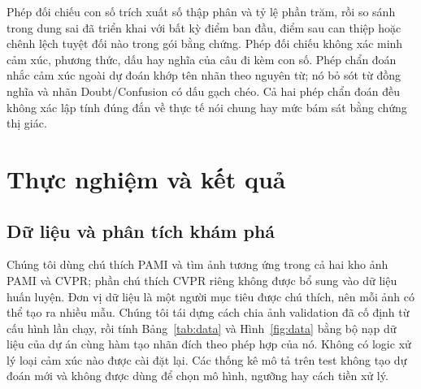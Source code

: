 \documentclass[conference]{IEEEtran}
\begin{document}
Phép đối chiếu con số trích xuất số thập phân và tỷ lệ phần trăm, rồi so sánh trong dung sai đã triển khai với bất kỳ điểm ban đầu, điểm sau can thiệp hoặc chênh lệch tuyệt đối nào trong gói bằng chứng. Phép đối chiếu không xác minh cảm xúc, phương thức, dấu hay nghĩa của câu đi kèm con số. Phép chẩn đoán nhắc cảm xúc ngoài dự đoán khớp tên nhãn theo nguyên từ; nó bỏ sót từ đồng nghĩa và nhãn Doubt/Confusion có dấu gạch chéo. Cả hai phép chẩn đoán đều không xác lập tính đúng đắn về thực tế nói chung hay mức bám sát bằng chứng thị giác.

\section{Thực nghiệm và kết quả}\label{sec:experiments}
\subsection{Dữ liệu và phân tích khám phá}\label{sec:data}
Chúng tôi dùng chú thích PAMI và tìm ảnh tương ứng trong cả hai kho ảnh PAMI và CVPR; phần chú thích CVPR riêng không được bổ sung vào dữ liệu huấn luyện. Đơn vị dữ liệu là một người mục tiêu được chú thích, nên mỗi ảnh có thể tạo ra nhiều mẫu. Chúng tôi tái dựng cách chia ảnh validation đã cố định từ cấu hình lần chạy, rồi tính Bảng~\ref{tab:data} và Hình~\ref{fig:data} bằng bộ nạp dữ liệu của dự án cùng hàm tạo nhãn đích theo phép hợp của nó. Không có logic xử lý loại cảm xúc nào được cài đặt lại. Các thống kê mô tả trên test không tạo dự đoán mới và không được dùng để chọn mô hình, ngưỡng hay cách tiền xử lý.
\end{document}
